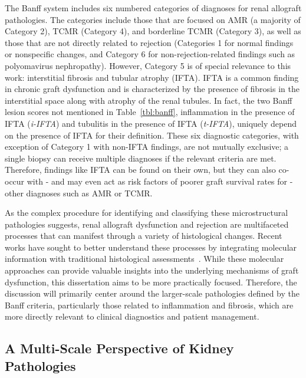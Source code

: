 

The Banff system includes six numbered categories of diagnoses for renal allograft pathologies. The categories include those that are focused on AMR (a majority of Category 2), TCMR (Category 4), and borderline TCMR (Category 3), as well as those that are not directly related to rejection (Categories 1 for normal findings or nonspecific changes, and Category 6 for non-rejection-related findings such as polyomavirus nephropathy). However, Category 5 is of special relevance to this work: interstitial fibrosis and tubular atrophy (IFTA). IFTA is a common finding in chronic graft dysfunction and is characterized by the presence of fibrosis in the interstitial space along with atrophy of the renal tubules. In fact, the two Banff lesion scores not mentioned in Table~\ref{tbl:banff}, inflammation in the presence of IFTA (\emph{i-IFTA}) and tubulitis in the presence of IFTA (\emph{t-IFTA}), uniquely depend on the presence of IFTA for their definition. These six diagnostic categories, with exception of Category 1 with non-IFTA findings, are not mutually exclusive; a single biopsy can receive multiple diagnoses if the relevant criteria are met. Therefore, findings like IFTA can be found on their own, but they can also co-occur with - and may even act as risk factors of poorer graft survival rates for - other diagnoses such as AMR or TCMR.

As the complex procedure for identifying and classifying these microstructural pathologies suggests, renal allograft dysfunction and rejection are multifaceted processes that can manifest through a variety of histological changes. Recent works have sought to better understand these processes by integrating molecular information with traditional histological assessments~\cite{bloom_CellFree_2017,sugi_Imaging_2019,goutaudier_Evaluation_2024}. While these molecular approaches can provide valuable insights into the underlying mechanisms of graft dysfunction, this dissertation aims to be more practically focused. Therefore, the discussion will primarily center around the larger-scale pathologies defined by the Banff criteria, particularly those related to inflammation and fibrosis, which are more directly relevant to clinical diagnostics and patient management.

\subsection{A Multi-Scale Perspective of Kidney Pathologies}

